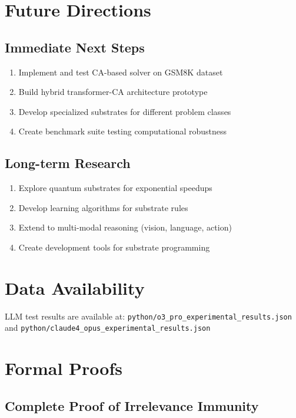 \documentclass[11pt,letterpaper]{article}
\theoremstyle{plain}
\theoremstyle{definition}
\theoremstyle{remark}
\begin{document}
\section{Future Directions}

\subsection{Immediate Next Steps}
\begin{enumerate}
\item Implement and test CA-based solver on GSM8K dataset
\item Build hybrid transformer-CA architecture prototype
\item Develop specialized substrates for different problem classes
\item Create benchmark suite testing computational robustness
\end{enumerate}

\subsection{Long-term Research}
\begin{enumerate}
\item Explore quantum substrates for exponential speedups
\item Develop learning algorithms for substrate rules
\item Extend to multi-modal reasoning (vision, language, action)
\item Create development tools for substrate programming
\end{enumerate}

\section*{Data Availability}
LLM test results are available at: \texttt{python/o3\_pro\_experimental\_results.json} and \texttt{python/claude4\_opus\_experimental\_results.json}




\appendix

\section{Formal Proofs}

\subsection{Complete Proof of Irrelevance Immunity}
\end{document}
